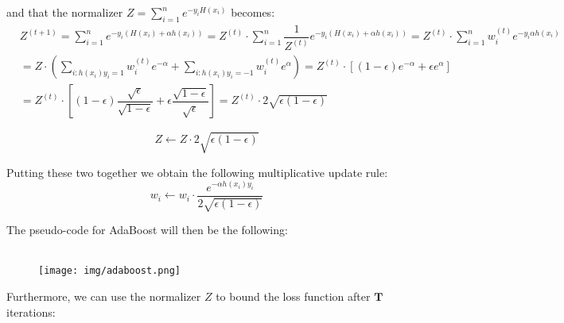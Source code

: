 \documentclass[twoside]{article}
\begin{document}
and that the normalizer $Z = \sum_{i=1}^{n} e^{-y_{i}H(x_{i})} $ becomes:
\begin{equation*}
\begin{aligned}
&  
  Z^{(t+1)} = \sum_{i=1}^{n} e^{-y_{i}(H(x_{i})+ \alpha h(x_{i}))} = Z^{(t)} \cdot \sum_{i=1}^{n} \dfrac{1}{Z^{(t)}} e^{-y_{i}(H(x_{i})+ \alpha h(x_{i}))} = Z^{(t)} \cdot \sum_{i=1}^{n} w_{i}^{(t)} e^{-y_{i} \alpha h(x_{i})}
  \\
  &  = Z \cdot ( \sum_{i:h(x_{i})y_{i}=1} w_{i}^{(t)} e^{-\alpha} + \sum_{i:h(x_{i})y_{i}=-1} w_{i}^{(t)} e^{\alpha}) = Z^{(t)} \cdot [(1-\epsilon)e^{-\alpha} + \epsilon e^{\alpha} ] \\ 
  & = Z^{(t)} \cdot [(1-\epsilon) \dfrac{\sqrt{\epsilon}}{\sqrt{1-\epsilon}} + \epsilon \dfrac{\sqrt{1-\epsilon}}{\sqrt{\epsilon}}  ] = Z^{(t)} \cdot 2\sqrt{\epsilon (1-\epsilon)}
\end{aligned}
\end{equation*}

$$Z \leftarrow Z \cdot 2 \sqrt{\epsilon (1-\epsilon)}$$

Putting these two together we obtain the following multiplicative update rule:
$$ w_{i} \leftarrow w_{i} \cdot \dfrac{e^{-\alpha h(x_{i}) y_{i}}}{2 \sqrt{\epsilon (1-\epsilon)}}$$

The pseudo-code for AdaBoost will then be the following: 
\\ \\ 
\begin{figure}[h]
\centering
\texttt{[image: img/adaboost.png]}
\end{figure}

\newpage
Furthermore, we can use the normalizer $Z$ to bound the loss function after $\mathbf{T}$ iterations:
\end{document}
